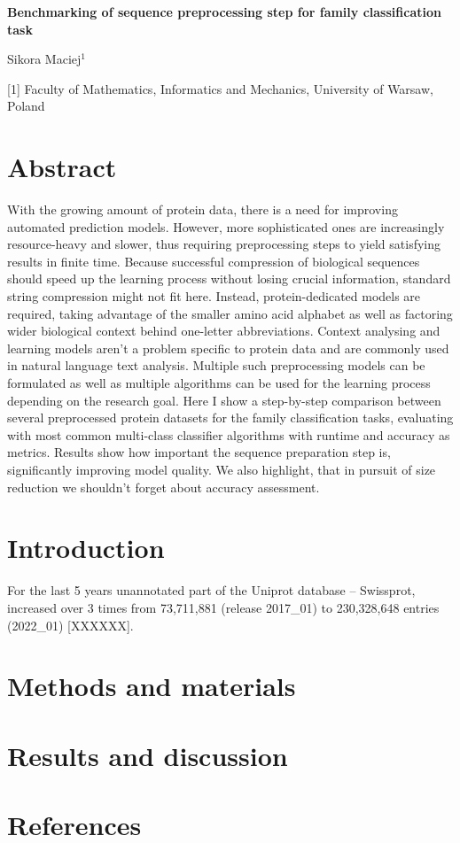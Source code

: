 \documentclass[12pt]{article}
\begin{document}
\begin{center}
\textbf{Benchmarking of sequence preprocessing step for family classification task}
\end{center}


\begin{center}
Sikora Maciej$^{1}$
\end{center}

[1] Faculty of Mathematics, Informatics and Mechanics, University of Warsaw, Poland \newline

\section*{Abstract}
With the growing amount of protein data, there is a need for improving automated prediction models. However, more sophisticated ones are increasingly resource-heavy and slower, thus requiring preprocessing steps to yield satisfying results in finite time. Because successful compression of biological sequences should speed up the learning process without losing crucial information, standard string compression might not fit here. Instead, protein-dedicated models are required, taking advantage of the smaller amino acid alphabet as well as factoring wider biological context behind one-letter abbreviations.
Context analysing and learning models aren't a problem specific to protein data and are commonly used in natural language text analysis. Multiple such preprocessing models can be formulated as well as multiple algorithms can be used for the learning process depending on the research goal. Here I show a step-by-step comparison between several preprocessed protein datasets for the family classification tasks, evaluating with most common multi-class classifier algorithms with runtime and accuracy as metrics. Results show how important the sequence preparation step is, significantly improving model quality. We also highlight, that in pursuit of size reduction we shouldn't forget about accuracy assessment.

\section*{Introduction}
For the last 5 years unannotated part of the Uniprot database -- Swissprot, increased over 3 times from 73,711,881 (release 2017\_01) to 230,328,648 entries (2022\_01) [XXXXXX].

\section*{Methods and materials}
\section*{Results and discussion}
\section*{References}
\end{document}
